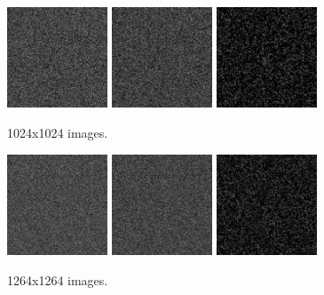 \documentclass{article}
\begin{document}
\begin{multicols}{2}
\begin{figure}[H]
\centering
\includegraphics[width=3cm]{pngimages/1024-1.png}
\includegraphics[width=3cm]{pngimages/1024-2.png}
\includegraphics[width=3cm]{pngimages/1024-100.png}
\caption{1024x1024 images.}
\end{figure}

\begin{figure}[H]
\centering
\includegraphics[width=3cm]{pngimages/1264-1.png}
\includegraphics[width=3cm]{pngimages/1264-2.png}
\includegraphics[width=3cm]{pngimages/1264-100.png}
\caption{1264x1264 images.}
\end{figure}

\end{multicols}
\end{document}
